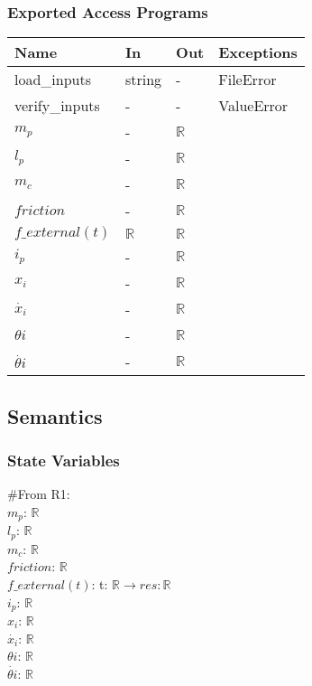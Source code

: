 \documentclass[12pt, titlepage]{article}
\begin{document}
\subsubsection{Exported Access Programs}

\begin{tabular}{p{3cm} p{2cm} p{2cm} >{\raggedright\arraybackslash}p{6cm}}
\toprule
\textbf{Name} & \textbf{In} & \textbf{Out} & \textbf{Exceptions} \\
\midrule
load\_inputs & string & - &  FileError \\
verify\_inputs & - & - & ValueError \\
$ m_p$ & - & $\mathbb{R}$\\
$l_p$ & - & $\mathbb{R}$\\
$m_c$ & - & $\mathbb{R}$\\
$friction$ & - & $\mathbb{R}$\\
$f\_external(t)$ & $\mathbb{R}$ & $\mathbb{R}$&\\
$i_p$& - & $\mathbb{R}$\\
$x_i$ & - & $\mathbb{R}$\\
$\dot{x_i}$ & - & $\mathbb{R}$\\
$\theta{i}$ & - & $\mathbb{R}$\\
$\dot{\theta{i}}$ & - & $\mathbb{R}$\\

\bottomrule
\end{tabular}
\subsection{Semantics}

\subsubsection{State Variables}
\#From R1:\\
$ m_p$: $\mathbb{R}$\\
$l_p$: $\mathbb{R}$\\
$m_c$: $\mathbb{R}$\\
$friction$: $\mathbb{R}$\\
$f\_external(t)$: t: $\mathbb{R} \rightarrow res: \mathbb{R}$\\
$i_p$: $\mathbb{R}$\\
$x_i$: $\mathbb{R}$\\
$\dot{x_i}$: $\mathbb{R}$\\
$\theta{i}$: $\mathbb{R}$\\
$\dot{\theta{i}}$: $\mathbb{R}$\\
\end{document}
